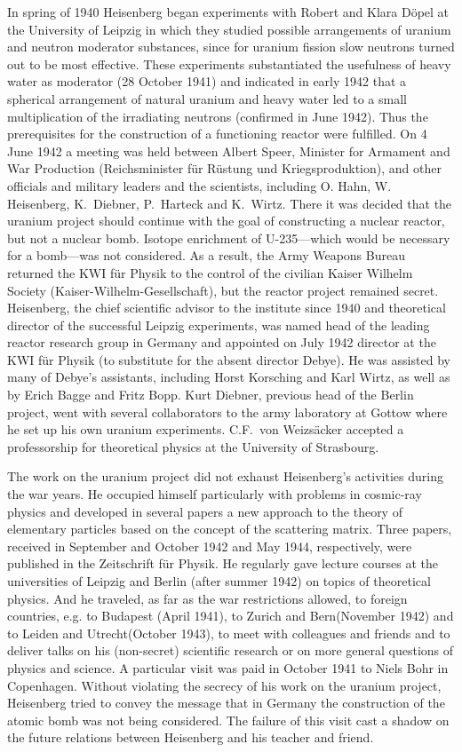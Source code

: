 \documentclass{article}
\begin{document}
In spring of 1940 Heisenberg began experiments with Robert and Klara Döpel at the University of Leipzig in which they studied possible arrangements of uranium and neutron moderator substances, since for uranium fission slow neutrons turned out to be most effective. These experiments substantiated the usefulness of heavy water as moderator (28 October 1941) and indicated in early 1942 that a spherical arrangement of natural uranium and heavy water led to a small multiplication of the irradiating neutrons (confirmed in June 1942). Thus the prerequisites for the construction of a functioning reactor were fulfilled. On 4 June 1942 a meeting was held between Albert Speer, Minister for Armament and War Production (Reichsminister für Rüstung und Kriegsproduktion), and other officials and military leaders and the scientists, including O. Hahn, W. Heisenberg, K.~Diebner, P.~Harteck and K.~Wirtz. There it was decided that the uranium project should continue with the goal of constructing a nuclear reactor, but not a nuclear bomb. Isotope enrichment of U-235---which would be necessary for a bomb---was not considered. As a result, the Army Weapons Bureau returned the KWI für Physik to the control of the civilian Kaiser Wilhelm Society (Kaiser-Wilhelm-Gesellschaft), but the reactor project remained secret. Heisenberg, the chief scientific advisor to the institute since 1940 and theoretical director of the successful Leipzig experiments, was named head of the leading reactor research group in Germany and appointed on July 1942 director at the KWI für Physik (to substitute for the absent director Debye). He was assisted by many of Debye's assistants, including Horst Korsching and Karl Wirtz, as well as by Erich Bagge and Fritz Bopp. Kurt Diebner, previous head of the Berlin project, went with several collaborators to the army laboratory at Gottow where he set up his own uranium experiments. C.F.~von Weizsäcker accepted a professorship for theoretical physics at the University of Strasbourg.

The work on the uranium project did not exhaust Heisenberg's activities during the war years. He occupied himself particularly with problems in cosmic-ray physics and developed in several papers a new approach to the theory of elementary particles based on the concept of the scattering matrix. Three papers, received in September and October 1942 and May 1944, respectively, were published in the Zeitschrift für Physik. He regularly gave lecture courses at the universities of Leipzig and Berlin (after summer 1942) on topics of theoretical physics. And he traveled, as far as the war restrictions allowed, to foreign countries, e.g. to Budapest (April 1941), to Zurich and Bern(November 1942) and to Leiden and Utrecht(October 1943), to meet with colleagues and friends and to deliver talks on his (non-secret) scientific research or on more general questions of physics and science. A particular visit was paid in October 1941 to Niels Bohr in Copenhagen. Without violating the secrecy of his work on the uranium project, Heisenberg tried to convey the message that in Germany the construction of the atomic bomb was not being considered. The failure of this visit cast a shadow on the future relations between Heisenberg and his teacher and friend.
\end{document}
